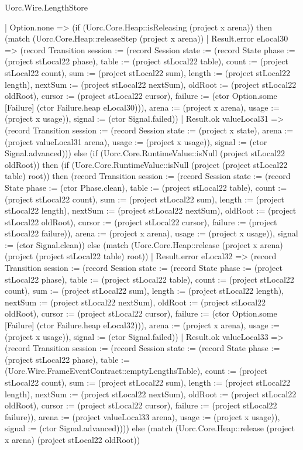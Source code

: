 \begin{lexlean}{Uorc.Wire.LengthStore}
\begin{semanticmodule}
{    | Option.none => (if (Uorc.Core.Heap::isReleasing (project x arena)) then (match (Uorc.Core.Heap::releaseStep (project x arena))
      | Result.error eLocal30 => (record Transition {session := (record Session {state := (record State {phase := (project stLocal22 phase), table := (project stLocal22 table), count := (project stLocal22 count), sum := (project stLocal22 sum), length := (project stLocal22 length), nextSum := (project stLocal22 nextSum), oldRoot := (project stLocal22 oldRoot), cursor := (project stLocal22 cursor), failure := (ctor Option.some [Failure] (ctor Failure.heap eLocal30))}), arena := (project x arena), usage := (project x usage)}), signal := (ctor Signal.failed)})
      | Result.ok valueLocal31 => (record Transition {session := (record Session {state := (project x state), arena := (project valueLocal31 arena), usage := (project x usage)}), signal := (ctor Signal.advanced)})) else (if (Uorc.Core.RuntimeValue::isNull (project stLocal22 oldRoot)) then (if (Uorc.Core.RuntimeValue::isNull (project (project stLocal22 table) root)) then (record Transition {session := (record Session {state := (record State {phase := (ctor Phase.clean), table := (project stLocal22 table), count := (project stLocal22 count), sum := (project stLocal22 sum), length := (project stLocal22 length), nextSum := (project stLocal22 nextSum), oldRoot := (project stLocal22 oldRoot), cursor := (project stLocal22 cursor), failure := (project stLocal22 failure)}), arena := (project x arena), usage := (project x usage)}), signal := (ctor Signal.clean)}) else (match (Uorc.Core.Heap::release (project x arena) (project (project stLocal22 table) root))
      | Result.error eLocal32 => (record Transition {session := (record Session {state := (record State {phase := (project stLocal22 phase), table := (project stLocal22 table), count := (project stLocal22 count), sum := (project stLocal22 sum), length := (project stLocal22 length), nextSum := (project stLocal22 nextSum), oldRoot := (project stLocal22 oldRoot), cursor := (project stLocal22 cursor), failure := (ctor Option.some [Failure] (ctor Failure.heap eLocal32))}), arena := (project x arena), usage := (project x usage)}), signal := (ctor Signal.failed)})
      | Result.ok valueLocal33 => (record Transition {session := (record Session {state := (record State {phase := (project stLocal22 phase), table := (Uorc.Wire.FrameEventContract::emptyLengthsTable), count := (project stLocal22 count), sum := (project stLocal22 sum), length := (project stLocal22 length), nextSum := (project stLocal22 nextSum), oldRoot := (project stLocal22 oldRoot), cursor := (project stLocal22 cursor), failure := (project stLocal22 failure)}), arena := (project valueLocal33 arena), usage := (project x usage)}), signal := (ctor Signal.advanced)}))) else (match (Uorc.Core.Heap::release (project x arena) (project stLocal22 oldRoot))
}
\end{semanticmodule}
\end{lexlean}
